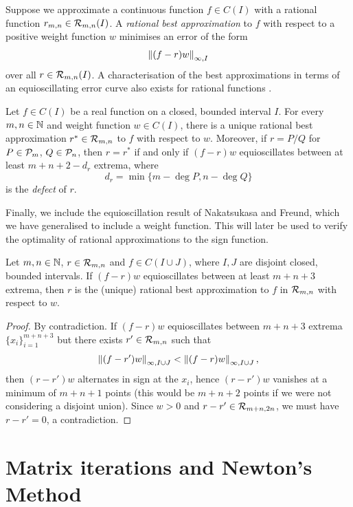 \bigskip{}

Suppose we approximate a continuous function $f\in C(I)$ with a rational function $r_{m,n} \in \mathcal{R}_{m,n}(I)$. A \textit{rational best approximation} to $f$ with respect to a positive weight function $w$ minimises an error of the form
\[\left\lVert(f-r)w\right\rVert_{\infty,I}\]
over all $r\in \mathcal{R}_{m,n}(I)$. A characterisation of the best approximations in terms of an equioscillating error curve also exists for rational functions \cite[Chapter II]{AkhApprox}.

\begin{thm}\label{equithmrats}
Let $f \in C(I)$ be a real function on a closed, bounded interval $I$. For every $m,n \in \mathbb{N}$ and weight function $w\in C(I)$, there is a unique rational best approximation $r^* \in \mathcal{R}_{m,n}$ to $f$ with respect to $w$. Moreover, if $r=P/Q$ for $P \in \mathcal{P}_m$, $Q \in \mathcal{P}_n$, then $r = r^*$ if and only if $(f-r)w$ equioscillates between at least $m+n+2-d_r$ extrema, where 
\[d_r=\min\{m-\deg P,n-\deg Q\}\]
is the \emph{defect} of $r$.
\end{thm}

Finally, we include the equioscillation result of Nakatsukasa and Freund, which we have generalised to include a weight function. This will later be used to verify the optimality of rational approximations to the sign function.

\begin{thm}\label{disjointrat}
Let $m,n \in \mathbb{N}$, $r \in \mathcal{R}_{m,n}$ and $f \in C(I \cup J)$, where $I,J$ are disjoint closed, bounded intervals. If $(f-r)w$ equioscillates between at least $m+n+3$ extrema, then $r$ is the (unique) rational best approximation to $f$ in $\mathcal{R}_{m,n}$ with respect to $w$.
\end{thm}

\begin{proof}
By contradiction. If $(f-r)w$ equioscillates between $m+n+3$ extrema $\{x_i\}_{i=1}^{m+n+3}$ but there exists $r' \in \mathcal{R}_{m,n}$ such that 
\[\left\lVert(f-r')w\right\rVert_{\infty,I\cup J} < \left\lVert(f-r)w\right\rVert_{\infty,I\cup J},\]
then $(r-r')w$ alternates in sign at the $x_i$, hence $(r-r')w$ vanishes at a minimum of $m+n+1$ points (this would be $m+n+2$ points if we were not considering a disjoint union). Since $w>0$ and $r-r' \in \mathcal{R}_{m+n,2n}$, we must have $r-r'=0$, a contradiction.
\end{proof}

\section{Matrix iterations and Newton's Method}

